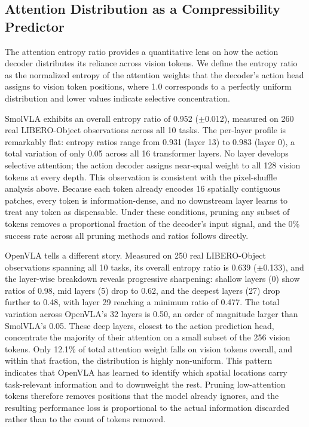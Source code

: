\subsection{Attention Distribution as a Compressibility Predictor}
\label{sec:attention_distribution}

The attention entropy ratio provides a quantitative lens on how the action decoder distributes its reliance across vision tokens. We define the entropy ratio as the normalized entropy of the attention weights that the decoder's action head assigns to vision token positions, where 1.0 corresponds to a perfectly uniform distribution and lower values indicate selective concentration.

SmolVLA exhibits an overall entropy ratio of 0.952 ($\pm$0.012), measured on 260 real LIBERO-Object observations across all 10 tasks. The per-layer profile is remarkably flat: entropy ratios range from 0.931 (layer 13) to 0.983 (layer 0), a total variation of only 0.05 across all 16 transformer layers. No layer develops selective attention; the action decoder assigns near-equal weight to all 128 vision tokens at every depth. This observation is consistent with the pixel-shuffle analysis above. Because each token already encodes 16 spatially contiguous patches, every token is information-dense, and no downstream layer learns to treat any token as dispensable. Under these conditions, pruning any subset of tokens removes a proportional fraction of the decoder's input signal, and the 0\% success rate across all pruning methods and ratios follows directly.

OpenVLA tells a different story. Measured on 250 real LIBERO-Object observations spanning all 10 tasks, its overall entropy ratio is 0.639 ($\pm$0.133), and the layer-wise breakdown reveals progressive sharpening: shallow layers (0) show ratios of 0.98, mid layers (5) drop to 0.62, and the deepest layers (27) drop further to 0.48, with layer 29 reaching a minimum ratio of 0.477. The total variation across OpenVLA's 32 layers is 0.50, an order of magnitude larger than SmolVLA's 0.05. These deep layers, closest to the action prediction head, concentrate the majority of their attention on a small subset of the 256 vision tokens. Only 12.1\% of total attention weight falls on vision tokens overall, and within that fraction, the distribution is highly non-uniform. This pattern indicates that OpenVLA has learned to identify which spatial locations carry task-relevant information and to downweight the rest. Pruning low-attention tokens therefore removes positions that the model already ignores, and the resulting performance loss is proportional to the actual information discarded rather than to the count of tokens removed.

